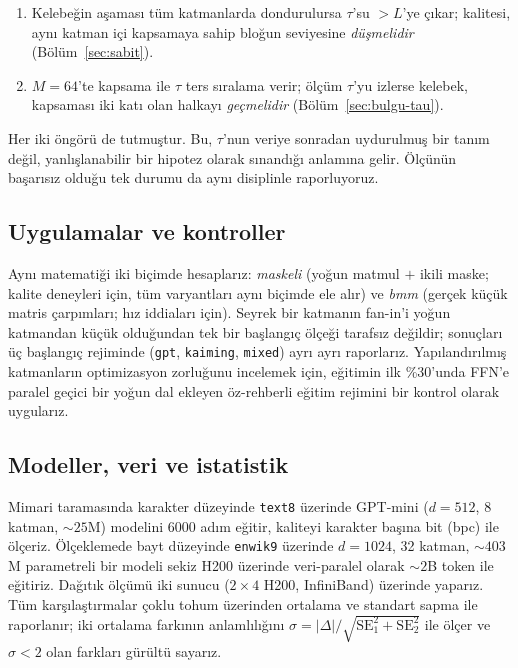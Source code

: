 \documentclass[10pt,journal]{IEEEtran}
\begin{document}
\begin{enumerate}
\item Kelebeğin aşaması tüm katmanlarda dondurulursa $\tau$'su $>L$'ye çıkar; kalitesi, aynı
katman içi kapsamaya sahip bloğun seviyesine \emph{düşmelidir}
(Bölüm~\ref{sec:sabit}).
\item $M{=}64$'te kapsama ile $\tau$ ters sıralama verir; ölçüm $\tau$'yu izlerse kelebek,
kapsaması iki katı olan halkayı \emph{geçmelidir} (Bölüm~\ref{sec:bulgu-tau}).
\end{enumerate}

Her iki öngörü de tutmuştur. Bu, $\tau$'nun veriye sonradan uydurulmuş bir tanım değil,
yanlışlanabilir bir hipotez olarak sınandığı anlamına gelir. Ölçünün başarısız olduğu tek
durumu da aynı disiplinle raporluyoruz.

\subsection{Uygulamalar ve kontroller}
Aynı matematiği iki biçimde hesaplarız: \emph{maskeli} (yoğun matmul $+$ ikili maske; kalite
deneyleri için, tüm varyantları aynı biçimde ele alır) ve \emph{bmm} (gerçek küçük matris
çarpımları; hız iddiaları için). Seyrek bir katmanın fan-in'i yoğun katmandan küçük olduğundan
tek bir başlangıç ölçeği tarafsız değildir; sonuçları üç başlangıç rejiminde (\texttt{gpt},
\texttt{kaiming}, \texttt{mixed}) ayrı ayrı raporlarız. Yapılandırılmış katmanların
optimizasyon zorluğunu incelemek için, eğitimin ilk \%30'unda FFN'e paralel geçici bir yoğun
dal ekleyen öz-rehberli eğitim rejimini \cite{wei2024} bir kontrol olarak uygularız.

\subsection{Modeller, veri ve istatistik}
Mimari taramasında karakter düzeyinde \texttt{text8} \cite{mahoney2011} üzerinde GPT-mini
($d{=}512$, 8 katman,
$\sim\!25$M) modelini 6000 adım eğitir, kaliteyi karakter başına bit (bpc) ile ölçeriz.
Ölçeklemede bayt düzeyinde \texttt{enwik9} üzerinde $d{=}1024$, 32 katman, $\sim\!403$M
parametreli bir modeli sekiz H200 üzerinde veri-paralel olarak $\sim\!2$B token ile eğitiriz.
Dağıtık ölçümü iki sunucu ($2{\times}4$ H200, InfiniBand) üzerinde yaparız. Tüm karşılaştırmalar
çoklu tohum üzerinden ortalama ve standart sapma ile raporlanır; iki ortalama farkının
anlamlılığını $\sigma = |\Delta| / \sqrt{\mathrm{SE}_1^2 + \mathrm{SE}_2^2}$ ile ölçer ve
$\sigma<2$ olan farkları gürültü sayarız.
\end{document}

